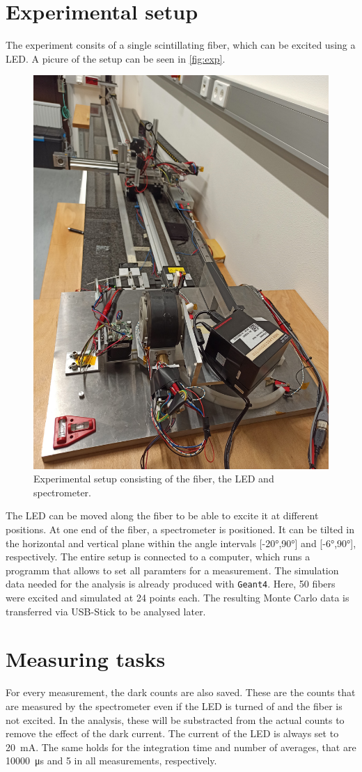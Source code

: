 \section{Experimental setup}
\label{sec:Experimental setup}

The experiment consits of a single scintillating fiber, which can be excited using a LED.
A picure of the setup can be seen in \autoref{fig:exp}.

\begin{figure}[H]
	\centering
	\includegraphics[width=0.5\linewidth]{pics/setup.jpg}
	\caption{Experimental setup consisting of the fiber, the LED and spectrometer.}
	\label{fig:exp}
\end{figure}

The LED can be moved along the fiber to be able to excite it at different positions. At one end of the fiber,
a spectrometer is positioned. It can be tilted in the horizontal and vertical plane within the angle intervals [-20°,90°]
and [-6°,90°], respectively.
The entire setup is connected to a computer, which runs a programm that allows to set all paramters for a measurement.
The simulation data needed for the analysis is already produced with \texttt{Geant4}. Here, 50 fibers were excited and simulated at 24 points each.
The resulting Monte Carlo data is transferred via USB-Stick to be analysed later.

\section{Measuring tasks}
\label{sec:Measuring tasks}

For every measurement, the dark counts are also saved. These are the counts that are measured by the spectrometer even
if the LED is turned of and the fiber is not excited. In the analysis, these will be substracted from the actual counts
to remove the effect of the dark current.
The current of the LED is always set to \qty{20}{\milli\ampere}. The same holds for the integration time and number of
averages, that are \qty{10000}{\micro\second} and \qty{5}{} in all measurements, respectively.

